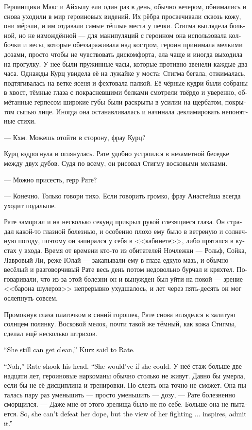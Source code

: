 \documentclass[a4paper,12pt,fleqn]{book}\usepackage{cooltooltips}\usepackage{polyglossia}\setdefaultlanguage[babelshorthands=true]{russian}\setotherlanguage{english}\defaultfontfeatures{Ligatures=TeX,Mapping=tex-text} \usepackage{xcolor}\definecolor{lightgray}{HTML}{bbbbbb}\color{lightgray}\newcommand{\ml}[3]{\textenglish{\textcolor{black}{#3}}}
\begin{document}
Героинщики Макс и Айхылу ели один раз в день, обычно вечером, обнимались и снова уходили в мир героиновых видений.
Их рёбра просвечивали сквозь кожу, они мёрзли, и им отдавали самые тёплые места у печки.
Стигма выглядела больной, но не измождённой --- для манипуляций с героином она использовала колбочки и весы, которые обеззараживала над костром, героин принимала мелкими дозами, просто чтобы не чувствовать дискомфорта, ела чаще и иногда выходила на прогулку.
У нее были пружинные часы, которые противно звенели каждые два часа.
Однажды Курц увидела её на лужайке у моста;
Стигма бегала, отжималась, подтягивалась на ветке ясеня и фехтовала палкой.
Её чёрные кудри были собраны в хвост, тёмные глаза с покрасневшими белками смотрели твёрдо и уверенно, обмётанные герпесом широкие губы были раскрыты в усилии на щербатом, покрытом сыпью лице.
Иногда она останавливалась и начинала декламировать непонятные стихи.

--- Кхм.
Можешь отойти в сторону, фрау Курц?

Курц вздрогнула и оглянулась.
Рате удобно устроился в незаметной беседке между двух дубов.
Судя по всему, он рисовал Стигму восковыми мелками.

--- Можно присесть, герр Рате?

--- Конечно.
Только говори тихо.
Если говорить громко, фрау Анастейша всегда уходит подальше.

Рате заморгал и на несколько секунд прикрыл рукой слезящиеся глаза.
Он страдал какой-то глазной болезнью, и особенно плохо ему было в ветреную и солнечную погоду, поэтому он запирался у себя в <<кабинете>>, либо прятался в кустах у входа.
Время от времени кто-то из обитателей Ночлежки --- Рольф, Сойка, Лавровый Ли, реже Юлай --- закапывали ему в глаза едкую мазь, и обычно весёлый и разговорчивый Рате весь день потом недовольно бурчал и кряхтел. %
Поговаривали, что из-за этой болезни он и вынужден был уйти на покой --- зрение <<барона шулеров>> непрерывно ухудшалось, и лет через пять-десять он мог ослепнуть совсем.

Промокнув глаза платочком в синий горошек, Рате снова вгляделся в залитую солнцем полянку.
Восковой мелок, почти такой же тёмный, как кожа Стигмы, сделал ещё несколько штрихов.

\ml{$0$}
{--- Она ещё может выбраться, --- сказала Курц Рате.}
{``She still can get clean,'' Kurz said to Rate.}

\ml{$0$}
{--- Неа, --- покачал головой Рате.}
{``Nah,'' Rate shook his head.}
\ml{$0$}
{--- Могла бы --- выбралась.}
{``She would've if she could.}
У неё стаж больше двенадцати лет, героиновые наркоманы обычно столько не живут.
Давно бы умерла, если бы не её дисциплина и тренировки.
Но слезть она точно не сможет.
Она пыталась пару раз уменьшить --- просто уменьшить --- дозу, --- Рате болезненно сморщился.
--- Даже мне от этого зрелища было не по себе.
Больше она не пытается.
\ml{$0$}
{Так что наркоту ей не победить, но смотреть, как она борется... признай, воодушевляет.}
{So, she can't defeat her dope, but the view of her fighting ... inspires, admit it.''}
\end{document}
